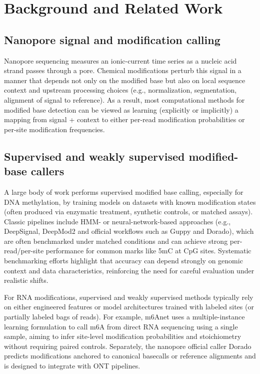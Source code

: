 \documentclass[journal,article,submit,pdftex,moreauthors]{Definitions/mdpi}
\begin{document}
\section{Background and Related Work}
\subsection{Nanopore signal and modification calling}
Nanopore sequencing measures an ionic-current time series as a nucleic acid strand passes through a pore. Chemical modifications perturb this signal in a manner that depends not only on the modified base but also on local sequence context and upstream processing choices (e.g., normalization, segmentation, alignment of signal to reference). As a result, most computational methods for modified base detection can be viewed as learning (explicitly or implicitly) a mapping from signal + context to either per-read modification probabilities or per-site modification frequencies.

\subsection{Supervised and weakly supervised modified-base callers}
A large body of work performs supervised modified base calling, especially for DNA methylation, by training models on datasets with known modification states (often produced via enzymatic treatment, synthetic controls, or matched assays). Classic pipelines include HMM- or neural-network-based approaches (e.g., DeepSignal\cite{ref2}, DeepMod2\cite{ref3} and official workflows such as Guppy and Dorado\cite{ref4}), which are often benchmarked under matched conditions and can achieve strong per-read/per-site performance for common marks like 5mC at CpG sites. Systematic benchmarking efforts highlight that accuracy can depend strongly on genomic context and data characteristics, reinforcing the need for careful evaluation under realistic shifts\cite{ref5}.

For RNA modifications, supervised and weakly supervised methods typically rely on either engineered features or model architectures trained with labeled sites (or partially labeled bags of reads). For example, m6Anet\cite{ref6} uses a multiple-instance learning formulation to call m6A from direct RNA sequencing using a single sample, aiming to infer site-level modification probabilities and stoichiometry without requiring paired controls. Separately, the nanopore official caller Dorado\cite{ref4} predicts modifications anchored to canonical basecalls or reference alignments and is designed to integrate with ONT pipelines.
\end{document}
